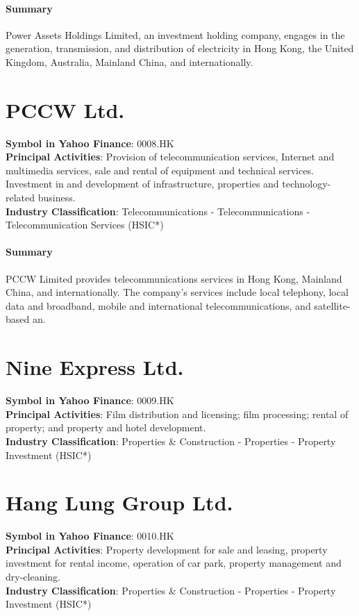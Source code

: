 \paragraph{Summary}
Power Assets Holdings Limited, an investment holding company, engages in the generation, transmission, and distribution of electricity in Hong Kong, the United Kingdom, Australia, Mainland China, and internationally.


\section{PCCW Ltd.}
\textbf{Symbol in Yahoo Finance}: 0008.HK\\
\textbf{Principal Activities}: Provision of telecommunication services, Internet and multimedia services, sale and rental of equipment and technical services. Investment in and development of infrastructure, properties and technology-related business.\\
\textbf{Industry Classification}: Telecommunications - Telecommunications - Telecommunication Services (HSIC*)
\paragraph{Summary}
PCCW Limited provides telecommunications services in Hong Kong, Mainland China, and internationally. The company's services include local telephony, local data and broadband, mobile and international telecommunications, and satellite-based an.


\section{Nine Express Ltd.}
\textbf{Symbol in Yahoo Finance}: 0009.HK\\
\textbf{Principal Activities}: Film distribution and licensing; film processing; rental of property; and property and hotel development.\\
\textbf{Industry Classification}: Properties \& Construction - Properties - Property Investment (HSIC*)


\section{Hang Lung Group Ltd.}
\textbf{Symbol in Yahoo Finance}: 0010.HK\\
\textbf{Principal Activities}: Property development for sale and leasing, property investment for rental income, operation of car park, property management and dry-cleaning.\\
\textbf{Industry Classification}: Properties \& Construction - Properties - Property Investment (HSIC*)
